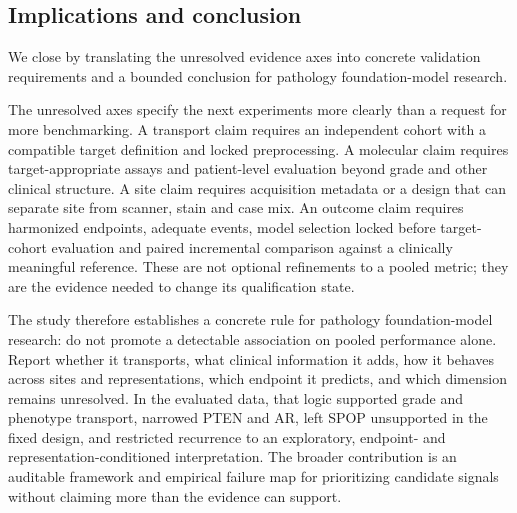\subsection{Implications and conclusion}

We close by translating the unresolved evidence axes into concrete validation requirements
and a bounded conclusion for pathology foundation-model research.

The unresolved axes specify the next experiments more clearly than a request for more
benchmarking. A transport claim requires an independent cohort with a compatible target
definition and locked preprocessing. A molecular claim requires target-appropriate assays
and patient-level evaluation beyond grade and other clinical structure. A site claim
requires acquisition metadata or a design that can separate site from scanner, stain and
case mix. An outcome claim requires harmonized endpoints, adequate events, model selection
locked before target-cohort evaluation and paired incremental comparison against a clinically meaningful
reference. These are not optional refinements to a pooled metric; they are the evidence
needed to change its qualification state.

The study therefore establishes a concrete rule for pathology foundation-model research:
do not promote a detectable association on pooled performance alone. Report whether it
transports, what clinical information it adds, how it behaves across sites and
representations, which endpoint it predicts, and which dimension remains unresolved. In the
evaluated data, that logic supported grade and phenotype transport, narrowed PTEN and AR,
left SPOP unsupported in the fixed design, and restricted recurrence to an exploratory,
endpoint- and representation-conditioned interpretation. The broader contribution is an
auditable framework and empirical failure map for prioritizing candidate signals without
claiming more than the evidence can support.
